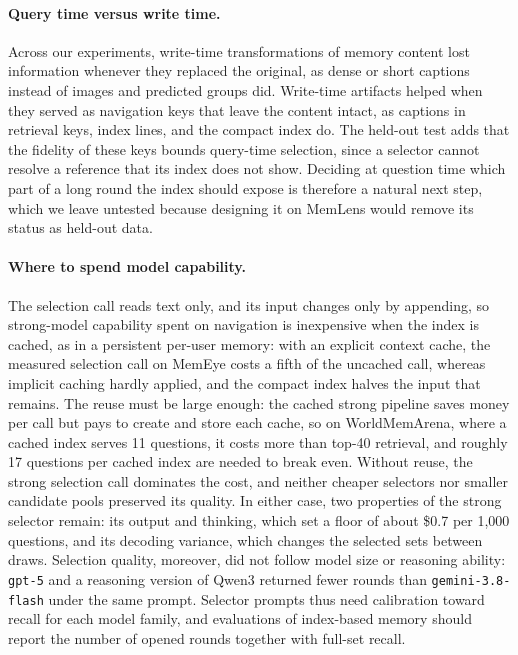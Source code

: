 \paragraph{Query time versus write time.} Across our experiments, write-time transformations of memory content lost information whenever they replaced the original, as dense or short captions instead of images and predicted groups did. Write-time artifacts helped when they served as navigation keys that leave the content intact, as captions in retrieval keys, index lines, and the compact index do. The held-out test adds that the fidelity of these keys bounds query-time selection, since a selector cannot resolve a reference that its index does not show. Deciding at question time which part of a long round the index should expose is therefore a natural next step, which we leave untested because designing it on MemLens would remove its status as held-out data.

\paragraph{Where to spend model capability.} The selection call reads text only, and its input changes only by appending, so strong-model capability spent on navigation is inexpensive when the index is cached, as in a persistent per-user memory: with an explicit context cache, the measured selection call on MemEye costs a fifth of the uncached call, whereas implicit caching hardly applied, and the compact index halves the input that remains. The reuse must be large enough: the cached strong pipeline saves money per call but pays to create and store each cache, so on WorldMemArena, where a cached index serves 11 questions, it costs more than top-40 retrieval, and roughly 17 questions per cached index are needed to break even. Without reuse, the strong selection call dominates the cost, and neither cheaper selectors nor smaller candidate pools preserved its quality. In either case, two properties of the strong selector remain: its output and thinking, which set a floor of about \$0.7 per 1,000 questions, and its decoding variance, which changes the selected sets between draws. Selection quality, moreover, did not follow model size or reasoning ability: \texttt{gpt-5} and a reasoning version of Qwen3 returned fewer rounds than \texttt{gemini-3.8-flash} under the same prompt. Selector prompts thus need calibration toward recall for each model family, and evaluations of index-based memory should report the number of opened rounds together with full-set recall.

